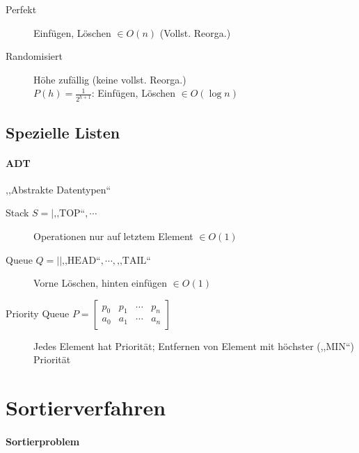 \begin{description}
  \item [Perfekt]
        Einfügen, Löschen $\in O(n)$ (Vollst. Reorga.)

  \item [Randomisiert]
        Höhe zufällig (keine vollst. Reorga.) \\
        $P(h) = \frac{1}{2^{h + 1}}$: Einfügen, Löschen $\in O(\log n)$
\end{description}

\subsection{Spezielle Listen}

\paragraph{ADT} ,,Abstrakte Datentypen``

\begin{description}
  \item [Stack $S = | \text{,,TOP``}, \cdots$]
        Operationen nur auf letztem Element $\in O(1)$

  \item [Queue $Q = || \text{,,HEAD``}, \cdots, \text{,,TAIL``}$]
        Vorne Löschen, hinten einfügen $\in O(1)$

  \item [Priority Queue $P = \begin{bmatrix}
            p_0 & p_1 & \cdots & p_n \\
            a_0 & a_1 & \cdots & a_n
          \end{bmatrix}$]
        Jedes Element hat Priorität; Entfernen von Element mit höchster (,,MIN``) Priorität
\end{description}

\section{Sortierverfahren}

\paragraph{Sortierproblem}

